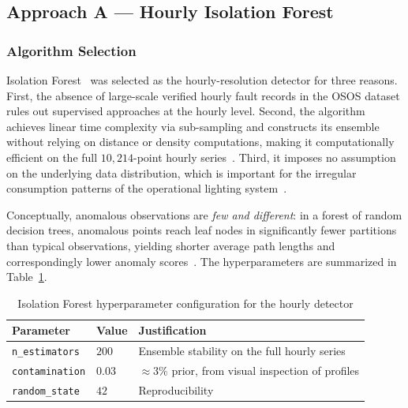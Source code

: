 \documentclass[11pt]{article}
\begin{document}
\subsection{Approach A --- Hourly Isolation Forest}
\label{subsec:approachA}

\subsubsection*{Algorithm Selection}
Isolation Forest~\cite{liu2008isolation,liu2012isolation} was selected as the hourly-resolution detector for three reasons. First, the absence of large-scale verified hourly fault records in the OSOS dataset rules out supervised approaches at the hourly level. Second, the algorithm achieves linear time complexity via sub-sampling and constructs its ensemble without relying on distance or density computations, making it computationally efficient on the full $10{,}214$-point hourly series~\cite{liu2012isolation}. Third, it imposes no assumption on the underlying data distribution, which is important for the irregular consumption patterns of the operational lighting system~\cite{chandola2009anomaly,nespoli2024street,ptacek2022road}.

Conceptually, anomalous observations are \emph{few and different}: in a forest of random decision trees, anomalous points reach leaf nodes in significantly fewer partitions than typical observations, yielding shorter average path lengths and correspondingly lower anomaly scores~\cite{liu2008isolation}. The hyperparameters are summarized in Table~\ref{tab:if_params}.

\begin{table}[H]
\centering
\caption{Isolation Forest hyperparameter configuration for the hourly detector}
\label{tab:if_params}
\begin{tabular}{lll}
\toprule
\textbf{Parameter} & \textbf{Value} & \textbf{Justification}\\
\midrule
\texttt{n\_estimators}  & $200$  & Ensemble stability on the full hourly series\\
\texttt{contamination}  & $0.03$ & $\approx 3\%$ prior, from visual inspection of profiles\\
\texttt{random\_state}  & $42$   & Reproducibility\\
\bottomrule
\end{tabular}
\end{table}
\end{document}
